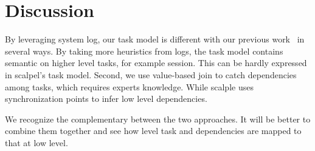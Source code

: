 
\section{Discussion}
\label{sec:discussion}

By leveraging system log, our task model is different with
our previous work~\cite{} in several ways.  By taking more
heuristics from logs, the task model contains semantic on
higher level tasks, for example session.  This can be hardly
expressed in scalpel's task model.  Second, we use
value-based join to catch dependencies among tasks, which
requires experts knowledge. While scalple uses
synchronization points to infer low level dependencies.

We recognize the complementary between the two approaches.
It will be better to combine them together and see how level
task and dependencies are mapped to that at low level.

